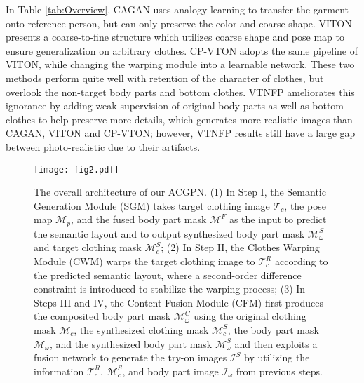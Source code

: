 \documentclass[10pt,twocolumn,letterpaper]{article}
\begin{document}
In Table \ref{tab:Overview}, CAGAN uses analogy learning to transfer the garment onto reference person, but can only preserve the color and coarse shape. VITON presents a coarse-to-fine structure which utilizes coarse shape and pose map to ensure generalization on arbitrary clothes. CP-VTON adopts the same pipeline of VITON, while changing the warping module into a learnable network. These two methods perform quite well with retention of the character of clothes, but overlook the non-target body parts and bottom clothes. VTNFP ameliorates this ignorance by adding weak supervision of original body parts as well as bottom clothes to help preserve more details, which generates more realistic images than CAGAN, VITON and CP-VTON; however, VTNFP results still have a large gap between photo-realistic due to their artifacts.



\begin{figure*}[t]
\begin{center}
\texttt{[image: fig2.pdf]}
\vspace{-10pt}
\end{center}
   \caption{\footnotesize The overall architecture of our ACGPN. (1) In Step I, the Semantic Generation Module (SGM) takes target clothing  image $\mathcal{T}_c$, the pose map $\mathcal{M}_{p}$, and the fused body part mask $\mathcal{M}^{F}$ as the input to predict the semantic layout and to output synthesized body part mask $\mathcal{M}^{S}_{\omega}$ and target clothing mask $\mathcal{M}^{S}_{c}$; (2) In Step II, the Clothes Warping Module (CWM) warps the target clothing  image to $\mathcal{T}^{R}_{c}$ according to the predicted semantic layout, where a second-order difference constraint is introduced to stabilize the warping process; (3) In Steps III and IV, the Content Fusion Module (CFM) first produces  the composited body part mask $\mathcal{M}^{C}_{\omega}$ using the original clothing mask $\mathcal{M}_{c}$, the synthesized clothing mask $\mathcal{M}^{S}_{c}$, the body part mask $\mathcal{M}_{\omega}$, and the synthesized body part mask $\mathcal{M}^{S}_{\omega}$ and then exploits a fusion network to generate the try-on images $\mathcal{I}^{S}$ by utilizing the information $\mathcal{T}^{R}_{c}$, $\mathcal{M}^{S}_{c}$, and body part image $\mathcal{I}_{\omega}$ from previous steps.}
\label{fig:2}
\vspace{-10pt}
\end{figure*}
\end{document}
